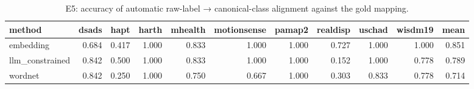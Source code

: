 \begin{table}
\caption{E5: accuracy of automatic raw-label → canonical-class alignment against the gold mapping.}
\label{tab:T8_label_alignment}
\begin{tabular}{lrrrrrrrrrr}
\toprule
method & dsads & hapt & harth & mhealth & motionsense & pamap2 & realdisp & uschad & wisdm19 & mean \\
\midrule
embedding & 0.684 & 0.417 & 1.000 & 0.833 & 1.000 & 1.000 & 0.727 & 1.000 & 1.000 & 0.851 \\
llm\_constrained & 0.842 & 0.500 & 1.000 & 0.833 & 1.000 & 1.000 & 0.152 & 1.000 & 0.778 & 0.789 \\
wordnet & 0.842 & 0.250 & 1.000 & 0.750 & 0.667 & 1.000 & 0.303 & 0.833 & 0.778 & 0.714 \\
\bottomrule
\end{tabular}
\end{table}
